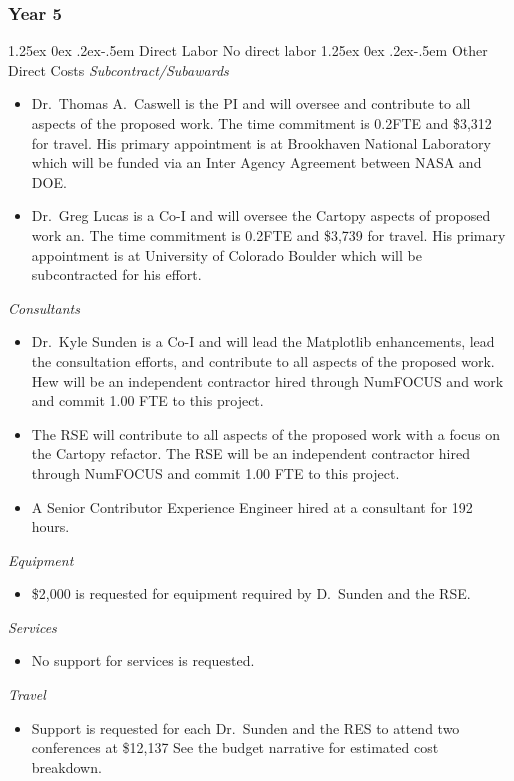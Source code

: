 \documentclass[12pt]{article}
\makeatletter
\numberwithin{page}{section}
\renewcommand{\paragraph}{%
  \@startsection{paragraph}{4}%
  {\z@}{1.25ex \@plus 0ex \@minus .2ex}{-.5em}%
  {\normalfont\normalsize\itshape\bfseries}%
}
\makeatother
\begin{document}
\subsubsection{Year 5}
\paragraph{Direct Labor}
No direct labor
\paragraph{Other Direct Costs}
\textit{Subcontract/Subawards}
\begin{itemize}
  \item Dr.\ Thomas A.\ Caswell is the PI and will oversee and contribute to
    all aspects of the proposed work.  The time commitment is 0.2FTE and \$3,312
    for travel.  His primary appointment is at Brookhaven National Laboratory
    which will be funded via an Inter Agency Agreement between NASA and DOE.
\item Dr.\ Greg Lucas is a Co-I and will oversee the Cartopy aspects of
  proposed work an.  The time commitment is 0.2FTE and \$3,739 for travel.  His
  primary appointment is at University of Colorado Boulder which will be
  subcontracted for his effort.
\end{itemize}
\textit{Consultants}
\begin{itemize}
  \item Dr.\ Kyle Sunden is a Co-I and will lead the Matplotlib enhancements,
    lead the consultation efforts, and contribute to all aspects of the
    proposed work.  Hew will be an independent contractor hired through NumFOCUS and work and commit
    1.00 FTE to this project.
  \item The RSE will contribute to all aspects of the proposed work with a
    focus on the Cartopy refactor.  The RSE will be an independent contractor hired
    through NumFOCUS and commit 1.00 FTE to this project.
  \item A Senior Contributor Experience Engineer hired at a consultant for 192 hours.

\end{itemize}
\textit{Equipment}
\begin{itemize}
\item \$2,000 is requested for equipment required by D.\ Sunden and the RSE.
\end{itemize}
\textit{Services}
\begin{itemize}
\item No support for services is requested.
\end{itemize}
\textit{Travel}
\begin{itemize}
\item Support is requested for each Dr.\ Sunden and the RES to attend two conferences at
  \$12,137  See the budget narrative for estimated cost  breakdown.
\end{itemize}




\end{document}
